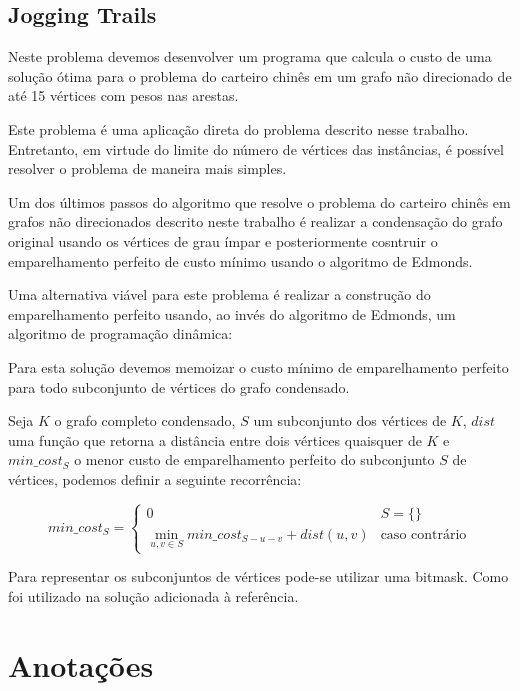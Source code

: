 \documentclass[12pt, a4paper]{article}
\begin{document}
        \subsection{Jogging Trails\cite{jogging}}
        
        Neste problema devemos desenvolver um programa que calcula o custo de uma solução ótima para o problema do carteiro chinês em um grafo não direcionado de até 15 vértices com pesos nas arestas.

        Este problema é uma aplicação direta do problema descrito nesse trabalho. 
        Entretanto, em virtude do limite do número de vértices das instâncias, é possível resolver o problema de maneira mais simples.

        Um dos últimos passos do algoritmo que resolve o problema do carteiro chinês em grafos não direcionados descrito neste trabalho é realizar a condensação do grafo original usando os vértices de grau ímpar e posteriormente cosntruir o emparelhamento perfeito de custo mínimo usando o algoritmo de Edmonds.

        Uma alternativa viável para este problema é realizar a construção do emparelhamento perfeito usando, ao invés do algoritmo de Edmonds, um algoritmo de programação dinâmica:

         Para esta solução devemos memoizar o custo mínimo de emparelhamento perfeito para todo subconjunto de vértices do grafo condensado.

        Seja $K$ o grafo completo condensado, $S$ um subconjunto dos vértices de $K$, $dist$ uma função que retorna a distância entre dois vértices quaisquer de $K$ e $min\_cost_S$ o menor custo de emparelhamento perfeito do subconjunto $S$ de vértices, podemos definir a seguinte recorrência:

        \[
            min\_cost_S = 
            \begin{cases} 
                0 & S = \{ \} \\
                \min_{u, v \in S} min\_cost_{S - u - v} + dist(u, v) & \text{caso contrário}
            \end{cases}
        \]

        Para representar os subconjuntos de vértices pode-se utilizar uma bitmask.
        Como foi utilizado na solução\cite{jogging-sol} adicionada à referência.




    \iffalse
        \section{Anotações}
\end{document}
